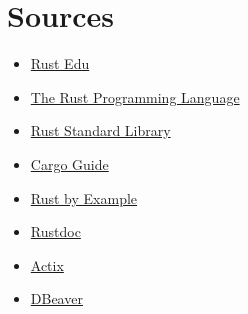 \documentclass[a4paper,12pt]{article}
\begin{document}
	\section{Sources}
	\label{sec:Sources}
	\begin{itemize}
		\item \href{https://rust-edu.org/resources/}{Rust Edu}
		\item \href{https://doc.rust-lang.org/book/}{The Rust Programming Language}
		\item \href{https://doc.rust-lang.org/std/}{Rust Standard Library}
		\item \href{https://doc.rust-lang.org/cargo/}{Cargo Guide}
		\item \href{https://doc.rust-lang.org/rust-by-example/}{Rust by Example}
		\item \href{https://doc.rust-lang.org/rustdoc/}{Rustdoc}
		\item \href{https://actix.rs/}{Actix}
		\item \href{https://dbeaver.io/}{DBeaver}
	\end{itemize}
	\printbibliography[title={Whole bibliography}]
\end{document}
